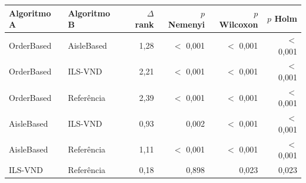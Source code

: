 \small
\begin{tabular}{llrrrr}
\toprule
Algoritmo A & Algoritmo B & $\Delta$ rank & $p$ Nemenyi & $p$ Wilcoxon & $p$ Holm \\
\midrule
OrderBased & AisleBased & 1,28 & $<$ 0,001 & $<$ 0,001 & $<$ 0,001 \\
OrderBased & ILS-VND & 2,21 & $<$ 0,001 & $<$ 0,001 & $<$ 0,001 \\
OrderBased & Referência & 2,39 & $<$ 0,001 & $<$ 0,001 & $<$ 0,001 \\
AisleBased & ILS-VND & 0,93 & 0,002 & $<$ 0,001 & $<$ 0,001 \\
AisleBased & Referência & 1,11 & $<$ 0,001 & $<$ 0,001 & $<$ 0,001 \\
ILS-VND & Referência & 0,18 & 0,898 & 0,023 & 0,023 \\
\bottomrule
\end{tabular}